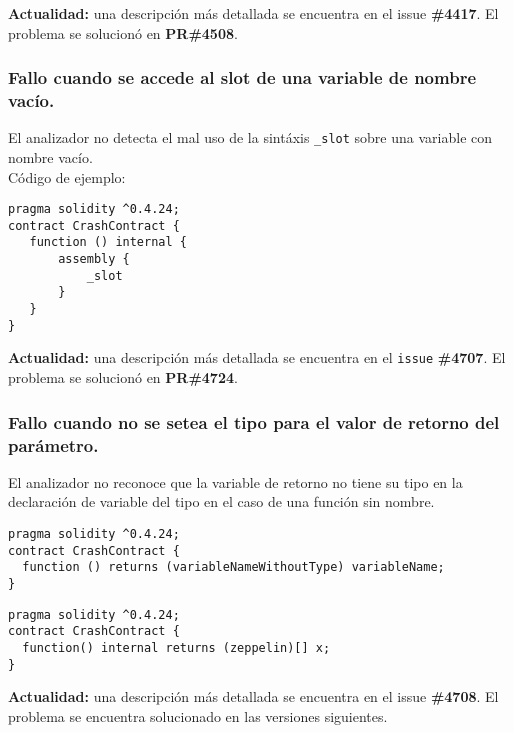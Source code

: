 \textbf{Actualidad:} una descripción más detallada se encuentra en el issue \textbf{\#4417}\cite{GHI4417}. El problema se solucionó en \textbf{PR\#4508}\cite{GHPR4508}.\\

\subsubsection{Fallo cuando se accede al slot de una variable de nombre vacío.}

El analizador no detecta el mal uso de la sintáxis \texttt{\_slot} sobre una variable con nombre vacío.\\

Código de ejemplo:
\begin{lstlisting}[language=Solidity, caption={Código de ejemplo para fallo con \texttt{\_slot}}]
pragma solidity ^0.4.24;
contract CrashContract {
   function () internal {
       assembly {
           _slot
       }
   }
}
\end{lstlisting}

\textbf{Actualidad:} una descripción más detallada se encuentra en el \texttt{issue} \textbf{\#4707}\cite{GHI4707}. El problema se solucionó en \textbf{PR\#4724}\cite{GHPR4724}.\\

\subsubsection{Fallo cuando no se setea el tipo para el valor de retorno del parámetro.}

El analizador no reconoce que la variable de retorno no tiene su tipo en la declaración de variable del tipo en el caso de una función sin nombre.\\

\begin{lstlisting}[language=Solidity, caption={Código de ejemplo para fallo con valor de retorno sin tipo \#1}]
pragma solidity ^0.4.24;
contract CrashContract {
  function () returns (variableNameWithoutType) variableName;
}
\end{lstlisting}

\begin{lstlisting}[language=Solidity, caption={Código de ejemplo para fallo con valor de retorno sin tipo \#2}]
pragma solidity ^0.4.24;
contract CrashContract {
  function() internal returns (zeppelin)[] x;
}
\end{lstlisting}

\textbf{Actualidad:} una descripción más detallada se encuentra en el issue \textbf{\#4708}\cite{GHI4708}. El problema se encuentra solucionado en las versiones siguientes. \\

